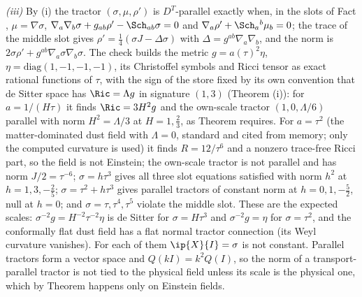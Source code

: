 \emph{(iii)} By (i) the tractor $(\sigma, \mu, \rho')$ is $D^{T}$-parallel exactly when, in the slots of Fact , $\mu = \nabla\sigma$, $\nabla_{a}\nabla_{b}\sigma + g_{ab}\rho' - \Sch_{ab}\sigma = 0$ and $\nabla_{a}\rho' + \Sch_{a}{}^{b}\mu_{b} = 0$; the trace of the middle slot gives $\rho' = \tfrac14(\sigma J - \Delta\sigma)$ with $\Delta = g^{ab}\nabla_{a}\nabla_{b}$, and the norm is $2\sigma\rho' + g^{ab}\nabla_{a}\sigma\nabla_{b}\sigma$. The check builds the metric $g = a(\tau)^{2}\eta$, $\eta = \mathrm{diag}(1, -1, -1, -1)$, its Christoffel symbols and Ricci tensor as exact rational functions of $\tau$, with the sign of the store fixed by its own convention that de Sitter space has $\Ric = \Lambda g$ in signature $(1,3)$ (Theorem (i)): for $a = 1/(H\tau)$ it finds $\Ric = 3H^{2}g$ and the own-scale tractor $(1, 0, \Lambda/6)$ parallel with norm $H^{2} = \Lambda/3$ at $H = 1, \tfrac23$, as Theorem  requires. For $a = \tau^{2}$ (the matter-dominated dust field with $\Lambda = 0$, standard and cited from memory; only the computed curvature is used) it finds $R = 12/\tau^{6}$ and a nonzero trace-free Ricci part, so the field is not Einstein; the own-scale tractor is not parallel and has norm $J/2 = \tau^{-6}$; $\sigma = h\tau^{3}$ gives all three slot equations satisfied with norm $h^{2}$ at $h = 1, 3, -\tfrac25$; $\sigma = \tau^{2} + h\tau^{3}$ gives parallel tractors of constant norm at $h = 0, 1, -\tfrac52$, null at $h = 0$; and $\sigma = \tau, \tau^{4}, \tau^{5}$ violate the middle slot. These are the expected scales: $\sigma^{-2}g = H^{-2}\tau^{-2}\eta$ is de Sitter for $\sigma = H\tau^{3}$ and $\sigma^{-2}g = \eta$ for $\sigma = \tau^{2}$, and the conformally flat dust field has a flat normal tractor connection (its Weyl curvature vanishes). For each of them $\ip{X}{I} = \sigma$ is not constant. Parallel tractors form a vector space and $Q(kI) = k^{2}Q(I)$, so the norm of a transport-parallel tractor is not tied to the physical field unless its scale is the physical one, which by Theorem  happens only on Einstein fields.

